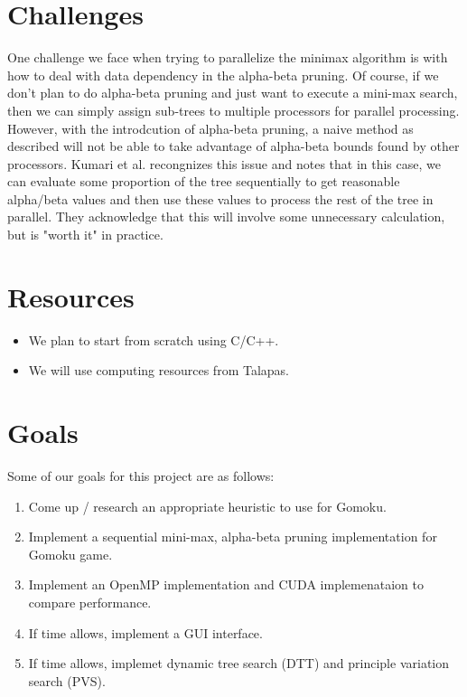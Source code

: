 \documentclass[12pt]{article}
\begin{document}
	\section{Challenges}

    One challenge we face when trying to parallelize the minimax algorithm is with how to deal with data dependency in the alpha-beta pruning. Of course, if we don't plan to do alpha-beta pruning and just want to execute a mini-max search, then we can simply assign sub-trees to multiple processors for parallel processing. However, with the introdcution of alpha-beta pruning, a naive method as described will not be able to take advantage of alpha-beta bounds found by other
    processors. Kumari et al. recongnizes this issue and notes that in this case, we can evaluate some proportion of the tree sequentially to get reasonable alpha/beta values and then use these values to process the rest of the tree in parallel. They acknowledge that this will involve some unnecessary calculation, but is "worth it" in practice. \cite{kumari_singh_2017} 
    
	\section{Resources}
	\begin{itemize}
		\item We plan to start from scratch using C/C++.
		\item We will use computing resources from Talapas. 
	\end{itemize}
    
    \section{Goals}
    Some of our goals for this project are as follows:
    \begin{enumerate}
        \item Come up / research an appropriate heuristic to use for Gomoku.
        \item Implement a sequential mini-max, alpha-beta pruning implementation for Gomoku game.
        \item Implement an OpenMP implementation and CUDA implemenataion to compare performance.
        \item If time allows, implement a GUI interface.
        \item If time allows, implemet dynamic tree search (DTT) and principle variation search (PVS).
    \end{enumerate}

	


\end{document}
